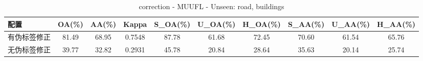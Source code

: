 \begin{table}[htbp]
\centering
\caption{correction - MUUFL - Unseen: road, buildings}
\begin{tabular}{lccccccccc}
\hline
配置 & OA(\%) & AA(\%) & Kappa & S\_OA(\%) & U\_OA(\%) & H\_OA(\%) & S\_AA(\%) & U\_AA(\%) & H\_AA(\%) \\
\hline
有伪标签修正 & 81.49 & 68.95 & 0.7548 & 87.78 & 61.68 & 72.45 & 70.60 & 61.54 & 65.76 \\
无伪标签修正 & 39.77 & 32.82 & 0.2931 & 45.78 & 20.84 & 28.64 & 35.63 & 20.14 & 25.74 \\
\hline
\end{tabular}
\end{table}